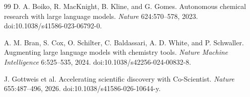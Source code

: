 \begin{thebibliography}{99}
D. A. Boiko, R. MacKnight, B. Kline, and G. Gomes. Autonomous chemical research with large language models. \emph{Nature} 624:570--578, 2023. doi:10.1038/s41586-023-06792-0.

A. M. Bran, S. Cox, O. Schilter, C. Baldassari, A. D. White, and P. Schwaller. Augmenting large language models with chemistry tools. \emph{Nature Machine Intelligence} 6:525--535, 2024. doi:10.1038/s42256-024-00832-8.

J. Gottweis et al. Accelerating scientific discovery with Co-Scientist. \emph{Nature} 655:487--496, 2026. doi:10.1038/s41586-026-10644-y.

\end{thebibliography}
